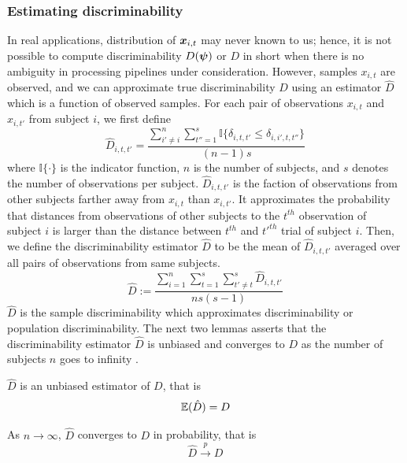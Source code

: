\documentclass{article}
\begin{document}
\subsubsection{Estimating discriminability}
In real applications, distribution of $\boldsymbol{x}_{i,t}$ may never known to us; hence, it is not possible to compute discriminability $D(\boldsymbol{\psi})$ or $D$ in short when there is no ambiguity in processing pipelines under consideration. However, samples $x_{i,t}$ are observed, and we can approximate true discriminability $D$ using an estimator $\hat{D}$ which is a function of observed samples. For each pair of observations $x_{i,t}$ and $x_{i,t'}$ from subject $i$, we first define
\[ \hat{D}_{i,t,t'} = \frac{\sum\limits_{i' \neq i}^{n} \sum\limits_{t''=1}^{s} \mathbb{I}\{\delta_{i,t,t'} \leq \delta_{i,i',t,t''} \} }{(n-1)s}\]
where $\mathbb{I}\{ \cdot \} $ is the indicator function, $n$ is the number of subjects, and $s$ denotes the number of observations per subject. $\hat{D}_{i,t,t'}$ is the faction of observations from other subjects farther away from $x_{i,t}$ than $x_{i,t'}$. It approximates the probability that distances from observations of other subjects to the $t^{th}$ observation of subject $i$ is larger than the distance between $t^{th}$ and $t'^{th}$ trial of subject $i$. Then, we define the discriminability estimator $\hat{D}$ to be the mean of $\hat{D}_{i,t,t'}$ averaged over all pairs of observations from same subjects.
\[ \hat{D} := \frac{\sum\limits_{i=1}^{n} \sum\limits_{t=1}^{s}  \sum\limits_{t' \neq t}^{s} \hat{D}_{i,t,t'}}{ns(s-1)} \]
$\hat{D}$ is the sample discriminability which approximates discriminability or population discriminability. The next two lemmas asserts that the discriminability estimator $\hat{D}$ is unbiased and converges to $D$ as the number of subjects $n$ goes to infinity \cite{bickel2015mathematical}.

\begin{lem}	
	$\hat{D}$ is an unbiased estimator of $D$, that is
	\[ \mathbb{E}(\hat{D}) = D\]
	\label{lem:lem1}
\end{lem}

\begin{lem}	
	As $n \rightarrow \infty$, $\hat{D}$ converges to $D$ in probability, that is
	\[\hat{D} \overset{p}{\rightarrow} D \]
	\label{lem:lem2}
\end{lem}
\end{document}
